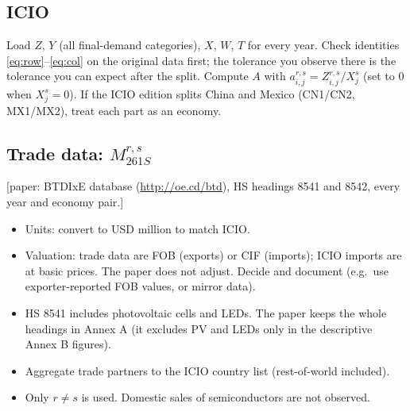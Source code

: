 \documentclass[11pt,a4paper]{article}
\theoremstyle{remark}
\theoremstyle{definition}
\newcommand{\sem}{{261S}}   %
\newcommand{\paper}[1]{\textcolor{blue!50!black}{[paper: #1]}}
\begin{document}
\subsection{ICIO}
Load $Z$, $Y$ (all final-demand categories), $X$, $W$, $T$ for every year. Check identities
\eqref{eq:row}--\eqref{eq:col} on the original data first; the tolerance you observe there is the tolerance you
can expect after the split. Compute $A$ with $a^{r,s}_{i,j} = Z^{r,s}_{i,j}/X^s_j$ (set to 0 when $X^s_j=0$).
If the ICIO edition splits China and Mexico (CN1/CN2, MX1/MX2), treat each part as an economy.

\subsection{Trade data: $M^{r,s}_\sem$}
\paper{BTDIxE database (\url{http://oe.cd/btd}), HS headings 8541 and 8542, every year and economy pair.}
\begin{itemize}[nosep]
  \item Units: convert to USD million to match ICIO.
  \item Valuation: trade data are FOB (exports) or CIF (imports); ICIO imports are at basic prices. The paper does
        not adjust. Decide and document (e.g.\ use exporter-reported FOB values, or mirror data).
  \item HS 8541 includes photovoltaic cells and LEDs. The paper keeps the whole headings in Annex A
        (it excludes PV and LEDs only in the descriptive Annex B figures).
  \item Aggregate trade partners to the ICIO country list (rest-of-world included).
  \item Only $r\neq s$ is used. Domestic sales of semiconductors are not observed.
\end{itemize}
\end{document}
